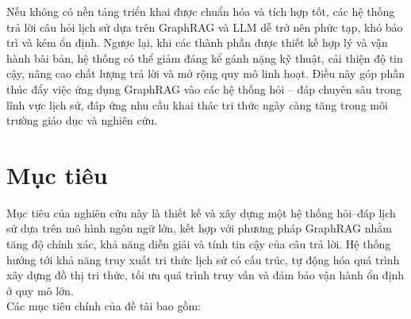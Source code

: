 Nếu không có nền tảng triển khai được chuẩn hóa và tích hợp tốt, các hệ thống trả lời câu hỏi lịch sử dựa trên GraphRAG và LLM dễ trở nên phức tạp, khó bảo trì và kém ổn định. Ngược lại, khi các thành phần được thiết kế hợp lý và vận hành bài bản, hệ thống có thể giảm đáng kể gánh nặng kỹ thuật, cải thiện độ tin cậy, nâng cao chất lượng trả lời và mở rộng quy mô linh hoạt. Điều này góp phần thúc đẩy việc ứng dụng GraphRAG vào các hệ thống hỏi – đáp chuyên sâu trong lĩnh vực lịch sử, đáp ứng nhu cầu khai thác tri thức ngày càng tăng trong môi trường giáo dục và nghiên cứu.

\section{Mục tiêu}
Mục tiêu của nghiên cứu này là thiết kế và xây dựng một hệ thống hỏi–đáp lịch sử dựa trên mô hình ngôn ngữ lớn, kết hợp với phương pháp GraphRAG nhằm tăng độ chính xác, khả năng diễn giải và tính tin cậy của câu trả lời. Hệ thống hướng tới khả năng truy xuất tri thức lịch sử có cấu trúc, tự động hóa quá trình xây dựng đồ thị tri thức, tối ưu quá trình truy vấn và đảm bảo vận hành ổn định ở quy mô lớn. \\
Các mục tiêu chính của đề tài bao gồm:

